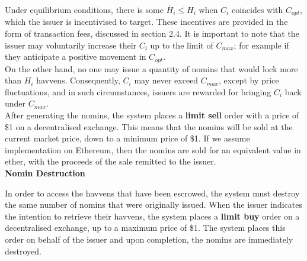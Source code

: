 \noindent Under equilibrium conditions, there is some \(\check{H_i} \leq H_i\)
when \(C_i\) coincides with \(C_{opt}\), which the issuer is incentivised to
target. These incentives are provided in the form of transaction fees,
discussed in section 2.4. It is important to note that the issuer may
voluntarily increase their \(C_i\) up to the limit of \(C_{max}\); for example if
they anticipate a positive movement in \(C_{opt}\). \\

\noindent On the other hand, no one may issue a quantity of nomins
that would lock more than \(H_i\) havvens. Consequently, \(C_i\) may never exceed
\(C_{max}\), except by price fluctuations, and in such circumstances, issuers
are rewarded for bringing \(C_i\) back under \(C_{max}\). \\

\noindent After generating the nomins, the system places a \textbf{limit
sell} order with a price of \$1 on a decentralised exchange. This means that
the nomins will be sold at the current market price, down to a minimum price
of \$1. If we assume implementation on Ethereum, then the nomins are sold for
an equivalent value in ether, with the proceeds of the sale remitted to the
issuer. \\

\noindent \textbf{Nomin Destruction}

\vspace{1mm}

\noindent In order to access the havvens that have been escrowed, the system
must destroy the same number of nomins that were originally issued. When the
issuer indicates the intention to retrieve their havvens, the system places a
\textbf{limit buy} order on a decentralised exchange, up to a maximum price
of \$1. The system places this order on behalf of the issuer and upon
completion, the nomins are immediately destroyed. \\
